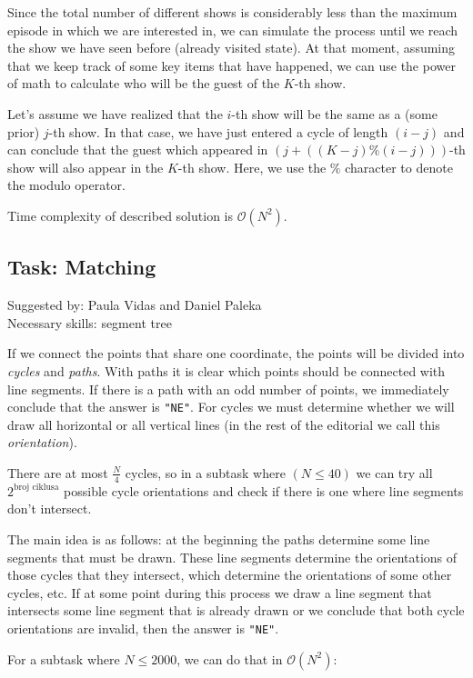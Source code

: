 \documentclass[a4paper]{article}
\begin{document}
Since the total number of different shows is considerably less than the maximum
episode in which we are interested in, we can simulate the process until we
reach the show we have seen before (already visited state). At that moment,
assuming that we keep track of some key items that have happened, we can use
the power of math to calculate who will be the guest of the $K$-th show.

Let's assume we have realized that the $i$-th show will be the same as a
(some prior) $j$-th show. In that case, we have just entered a cycle of
length $(i-j)$ and can conclude that the guest which appeared in $(j + ((K -
j) \% (i - j)))$-th show will also appear in the $K$-th show. Here, we
use the $\%$ character to denote the modulo operator.

Time complexity of described solution is $\mathcal{O}(N^2)$.

\clearpage

\subsection*{Task: Matching}
\textsf{Suggested by: Paula Vidas and Daniel Paleka}\\
\textsf{Necessary skills: segment tree}

If we connect the points that share one coordinate, the points will be
divided into \textit{cycles} and \textit{paths}. With paths it is clear which
points should be connected with line segments. If there is a path with an odd
number of points, we immediately conclude that the answer is \texttt{"NE"}. For
cycles we must determine whether we will draw all horizontal or all vertical
lines (in the rest of the editorial we call this \textit{orientation}).

There are at most $\frac{N}{4}$ cycles, so in a subtask where $(N \le 40)$
we can try all $2^{\text{broj ciklusa}}$ possible cycle orientations and check
if there is one where line segments don't intersect.

The main idea is as follows: at the beginning the paths determine some line
segments that must be drawn. These line segments determine the orientations
of those cycles that they intersect, which determine the orientations of some
other cycles, etc. If at some point during this process we draw a line segment
that intersects some line segment that is already drawn or we conclude that
both cycle orientations are invalid, then the answer is \texttt{"NE"}.

For a subtask where $N \leq 2000$, we can do that in $\mathcal{O}(N^2)$:
\end{document}
